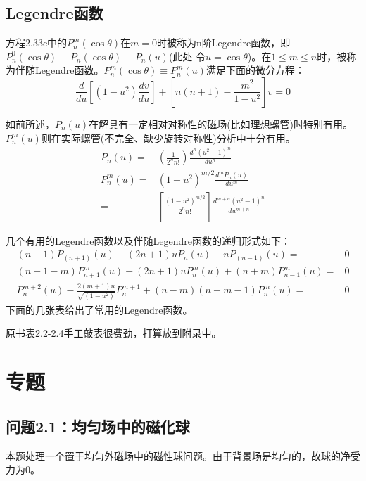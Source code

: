 \subsection{Legendre函数}
方程2.33c中的$P_n^m(\cos\theta)$在$m=0$时被称为n阶Legendre函数，即$P_n^0(\cos\theta)\equiv P_n(\cos\theta)\equiv P_n(u)$(此处
令$u=\cos\theta$)。在$1\le m \le n$时，被称为伴随Legendre函数。$P_n^m(\cos\theta)\equiv P_n^m(u)$满足下面的微分方程：
\begin{equation}\label{eqn:legendre diff}
  \frac{d}{du}[(1-u^2)\frac{dv}{du}]+[n(n+1)-\frac{m^2}{1-u^2}]v=0
\end{equation}

如前所述，$P_n(u)$在解具有一定相对对称性的磁场(比如理想螺管)时特别有用。$P_n^m(u)$则在实际螺管(不完全、缺少旋转对称性)分析中十分有用。
\begin{subequations}\label{eqn:legendre function1}
	\begin{align}
P_n(u)=&\left(\frac{1}{2^n n!}\right)\frac{d^n(u^2-1)^n}{du^n} \\
P_n^m(u)=&(1-u^2)^{m/2}\frac{d^mP_n(u)}{du^m}\\
=&\left[\frac{(1-u^2)^{m/2}}{2^n n!}\right]\frac{d^{m+n}(u^2-1)^n}{du^{m+n}}
  	\end{align}
\end{subequations}

几个有用的Legendre函数以及伴随Legendre函数的递归形式如下：
\begin{subequations}\label{eqn:legendre function2}
	\begin{align}
(n+1)P_(n+1)(u)-(2n+1)uP_n(u)+nP_(n-1)(u)=&0  \\
(n+1-m)P^m_{n+1}(u)-(2n+1)uP^m_n(u)+(n+m)P^m_{n-1}(u)=&0  \\
P_n^{m+2}(u)-\frac{2(m+1)u}{\sqrt{(1-u^2)}}P_n^{m+1}+(n-m)(n+m-1)P_n^m(u)=&0
  	\end{align}
\end{subequations}
下面的几张表给出了常用的Legendre函数。

\textcolor[rgb]{1.00,0.00,0.00}{原书表2.2-2.4手工敲表很费劲，打算放到附录中。}

\section{专题}
\subsection{问题2.1：均匀场中的磁化球}
本题处理一个置于均匀外磁场中的磁性球问题。由于背景场是均匀的，故球的净受力为0。

